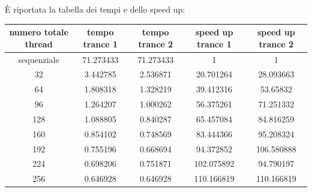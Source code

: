\documentclass[12pt,openany]{report}
\begin{document}
È riportata la tabella dei tempi e dello speed up:\begin{center}
    \begin{tabular}{|c|c|c|c|c|}
        \hline
        \rowcolor[HTML]{EFEFEF} 
        numero totale thread & tempo trance 1 & \cellcolor[HTML]{EFEFEF}tempo trance 2 & speed up trance 1 & speed up trance 2 \\ \hline
        sequenziale          & 71.273433      & 71.273433                              & 1                 & 1                 \\ \hline
        32                   & 3.442785       & 2.536871                               & 20.701264         & 28.093663         \\ \hline
        64                   & 1.808318       & 1.328219                               & 39.412316         & 53.65832          \\ \hline
        96                   & 1.264207       & 1.000262                               & 56.375261         & 71.251332         \\ \hline
        128                  & 1.088805       & 0.840287                               & 65.457084         & 84.816259         \\ \hline
        160                  & 0.854102       & 0.748569                               & 83.444366         & 95.208324         \\ \hline
        192                  & 0.755196       & 0.668694                               & 94.372852         & 106.580888        \\ \hline
        224                  & 0.698206       & 0.751871                               & 102.075892        & 94.790197         \\ \hline
        256                  & 0.646928       & 0.646928                               & 110.166819        & 110.166819        \\ \hline
        \end{tabular}
\end{center}
\end{document}
